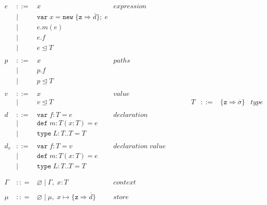\documentclass{llncs}
\begin{document}
\begin{figure}[h]
\[
\begin{array}{lll}
\begin{array}{lllr}
e & ::= & x & expression \\
& | & \texttt{var} \; x = \texttt{new} \; \{\texttt{z} \Rightarrow \overline{d}\}; \; e&\\
& | & e.m(e) &\\
& | & e.f &\\
& | & e \unlhd T&\\
&&\\
p & ::= & x & paths \\
& | & p.f &\\
& | & p \unlhd T &\\
&&\\
v & ::= & x & value \\
& | & v \unlhd T &\\
&&\\
d & ::= & \texttt{var} \; f : T = e & declaration \\
  & |   & \texttt{def} \; m : T(x:T) = e &\\
  & |   & \texttt{type} \; L : T .. T = T &\\
&&\\
d_v & ::= & \texttt{var} \; f : T = v & declaration \; value \\
  & |   & \texttt{def} \; m : T(x:T) = e &\\
  & |   & \texttt{type} \; L : T .. T = T &\\
&&\\
&&\\
\Gamma & :: = & \varnothing \; | \; \Gamma, \; x : T & context \\
&&\\
\mu & :: = & \varnothing \; | \; \mu,\; x \mapsto \{\texttt{z} \Rightarrow \overline{d}\} & store \\
\end{array}
& ~~~~~~
&
\begin{array}{lllr}
T & ::= & \{\texttt{z} \Rightarrow \overline{\sigma}\} & type \\

\end{array}
\end{array}\]
\end{figure}
\end{document}
